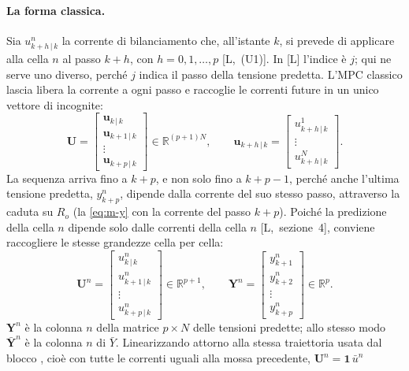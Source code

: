 \documentclass[11pt,a4paper]{article}
\newcommand{\file}[1]{\texttt{\detokenize{#1}}}
\newcommand{\uno}{\mathbf{1}}
\newcommand{\vett}[1]{\boldsymbol{#1}}      %
\begin{document}
\paragraph{La forma classica.} Sia $u^n_{k+h\,|\,k}$ la corrente di
bilanciamento che, all'istante $k$, si prevede di applicare alla cella $n$ al
passo $k+h$, con $h = 0, 1, \dots, p$ [L,~(U1)]. In [L] l'indice è $j$; qui ne
serve uno diverso, perché $j$ indica il passo della tensione predetta. L'MPC
classico lascia libera la corrente a ogni passo e raccoglie le correnti future
in un unico vettore di incognite:
\[
  \vett{U} = \begin{bmatrix} \vett{u}_{k\,|\,k} \\ \vett{u}_{k+1\,|\,k} \\ \vdots \\ \vett{u}_{k+p\,|\,k} \end{bmatrix}
      \in \mathbb{R}^{(p+1)N} ,
  \qquad
  \vett{u}_{k+h\,|\,k} = \begin{bmatrix} u^1_{k+h\,|\,k} \\ \vdots \\ u^N_{k+h\,|\,k} \end{bmatrix} .
\]
La sequenza arriva fino a $k+p$, e non solo fino a $k+p-1$, perché anche
l'ultima tensione predetta, $y^n_{k+p}$, dipende dalla corrente del suo stesso
passo, attraverso la caduta su $R_o$ (la \eqref{eq:m-y} con la corrente del
passo $k+p$). Poiché la predizione della cella $n$ dipende solo dalle correnti
della cella $n$ [L,~sezione~4], conviene raccogliere le stesse grandezze cella
per cella:
\[
  \vett{U}^n = \begin{bmatrix} u^n_{k\,|\,k} \\ u^n_{k+1\,|\,k} \\ \vdots \\ u^n_{k+p\,|\,k} \end{bmatrix}
        \in \mathbb{R}^{p+1} ,
  \qquad
  \vett{Y}^n = \begin{bmatrix} y^n_{k+1} \\ y^n_{k+2} \\ \vdots \\ y^n_{k+p} \end{bmatrix}
        \in \mathbb{R}^{p} .
\]
$\vett{Y}^n$ è la colonna $n$ della matrice $p \times N$ delle tensioni predette;
allo stesso modo $\bar{\vett{Y}}^n$ è la colonna $n$ di $\bar Y$. Linearizzando attorno
alla stessa traiettoria usata dal blocco \file{Predizione_linearizzata}, cioè
con tutte le correnti uguali alla mossa precedente, $\vett{U}^n = \uno\,\bar u^n$
\end{document}
